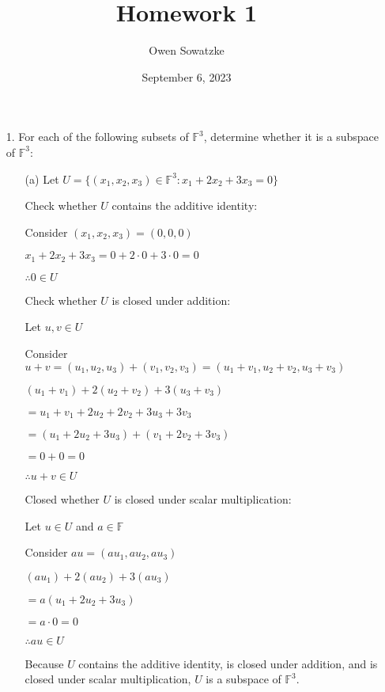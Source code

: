 \documentclass{article}
\title{Homework 1}
\author{Owen Sowatzke}
\date{September 6, 2023}
\begin{document}
	\setlength{\abovedisplayskip}{0pt}
	\setlength{\belowdisplayskip}{0pt}
		\setlength{\abovedisplayshortskip}{0pt}
	\setlength{\belowdisplayshortskip}{0pt}
	\doublespacing
	\maketitle
	
	\begin{enumerate}[nolistsep]
	
		\item[1.] For each of the following subsets of $\mathbb{F}^3$, determine whether it is a subspace of $\mathbb{F}^3$:
		
		\begin{enumerate}[nolistsep]
			
			\item[(a)] Let $U = {\{(x_1, x_2, x_3) \in \mathbb{F}^3 : x_1 + 2x_2 + 3x_3 = 0 \}}$
			
			Check whether $U$ contains the additive identity:
			
			Consider $(x_1, x_2, x_3) = (0, 0, 0)$
			
			$x_1 + 2x_2 + 3x_3 = 0 + 2 \cdot 0 + 3 \cdot 0 = 0$
			
			$\therefore 0 \in U$
			
			Check whether $U$ is closed under addition:
			
			Let $u,v \in U$
			
			Consider $u + v = (u_1, u_2, u_3) + (v_1, v_2, v_3) = (u_1 + v_1, u_2 + v_2, u_3 + v_3)$
			
			$(u_1 + v_1) + 2(u_2 + v_2) + 3(u_3 + v_3)$
			
			$ = u_1 + v_1 + 2u_2 + 2v_2 + 3u_3 + 3v_3$
			
			$ = (u_1 + 2u_2 + 3u_3) + (v_1 + 2v_2 + 3v_3)$
			
			$ = 0 + 0 = 0$
			
			$\therefore u + v \in U$
			
			Closed whether $U$ is closed under scalar multiplication:
			
			Let $u \in U$ and $a \in \mathbb{F}$
			
			Consider $au = (au_1, au_2, au_3)$
			
			$(au_1) + 2(au_2) + 3(au_3)$
			
			$ = a(u_1 + 2u_2 + 3u_3)$
			
			$ = a \cdot 0 = 0$
			
			$\therefore au \in U$
			
			Because $U$ contains the additive identity, is closed under addition, and is closed under scalar multiplication, $U$ is a subspace of $\mathbb{F}^3$.
			

\end{enumerate}
\end{enumerate}
\end{document}
